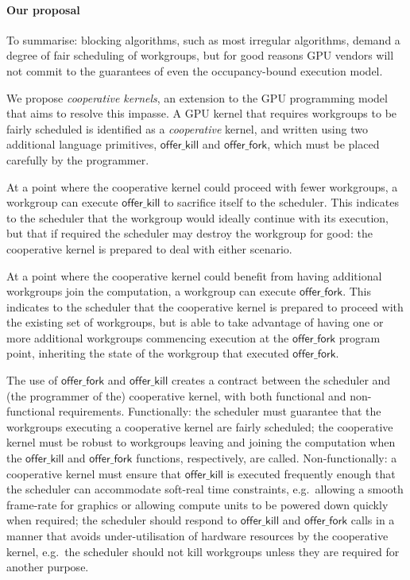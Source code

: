 \documentclass[nocopyrightspace]{sigplanconf-pldi16}
\newcommand{\offerfork}{\mathsf{offer\_fork}}
\newcommand{\offerkill}{\mathsf{offer\_kill}}
\begin{document}
\paragraph{Our proposal}
%
To summarise: blocking algorithms, such as most irregular algorithms,
demand a degree of fair scheduling of workgroups, but for good reasons
GPU vendors will not commit to the guarantees of even the
occupancy-bound execution model.

We propose \emph{cooperative kernels}, an extension to the GPU
programming model that aims to resolve this impasse.  A GPU kernel
that requires workgroups to be fairly scheduled is identified as a
\emph{cooperative} kernel, and written using two additional language
primitives, $\offerkill$ and $\offerfork$, which must be placed
carefully by the programmer.

At a point where the cooperative kernel could proceed with fewer
workgroups, a workgroup can execute $\offerkill$ to sacrifice itself to
the scheduler.  This indicates to the scheduler that the workgroup
would ideally continue with its execution, but that if required the
scheduler may destroy the workgroup for good: the cooperative kernel
is prepared to deal with either scenario.

At a point where the cooperative kernel could benefit from having
additional workgroups join the computation, a workgroup can execute
$\offerfork$.  This indicates to the scheduler that the cooperative
kernel is prepared to proceed with the existing set of workgroups, but
is able to take advantage of having one or more additional workgroups
commencing execution at the $\offerfork$ program point, inheriting the
state of the workgroup that executed $\offerfork$.

The use of $\offerfork$ and $\offerkill$ creates a contract between
the scheduler and (the programmer of the) cooperative kernel, with
both functional and non-functional requirements.  Functionally: the
scheduler must guarantee that the workgroups executing a cooperative
kernel are fairly scheduled; the cooperative kernel must be robust to
workgroups leaving and joining the computation when the $\offerkill$
and $\offerfork$ functions, respectively, are called.
Non-functionally: a cooperative kernel must ensure that $\offerkill$
is executed frequently enough that the scheduler can accommodate
soft-real time constraints, e.g.\ allowing a smooth frame-rate for
graphics or allowing compute units to be powered down quickly when
required; the scheduler should respond to $\offerkill$ and
$\offerfork$ calls in a manner that avoids under-utilisation of
hardware resources by the cooperative kernel, e.g.\ the scheduler
should not kill workgroups unless they are required for another
purpose.
\end{document}
